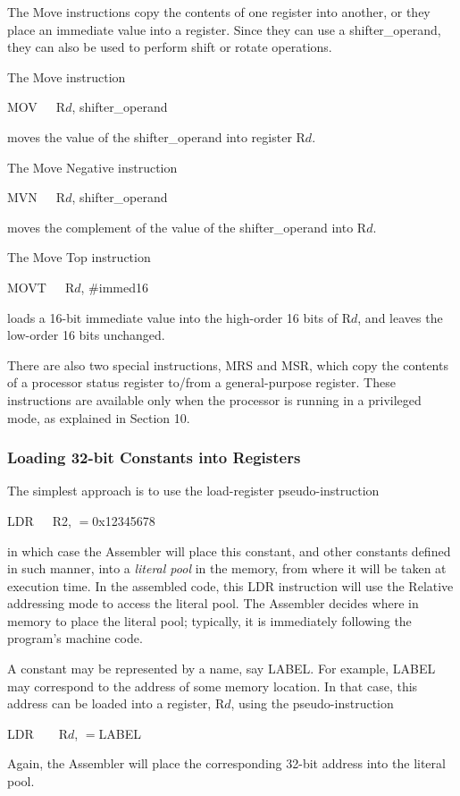 \documentclass[11pt, twoside, pdftex]{article}
\begin{document}
The Move instructions copy the contents of one register into another, or they place an immediate value into a register. 
Since they can use a shifter\_operand, they can also be used
to perform shift or rotate operations.

The Move instruction
\begin{center}
MOV~~~R$d$, shifter\_operand
\end{center}
\noindent 
moves the value of the shifter\_operand into register R$d$. 

The Move Negative instruction
\begin{center}
MVN~~~R$d$, shifter\_operand
\end{center}
\noindent
moves the complement of the value of the shifter\_operand
into R$d$.

The Move Top instruction
\begin{center}
MOVT~~~R$d$, \#immed16
\end{center}
\noindent
loads a 16-bit immediate value into the high-order 16 bits of
R$d$, and leaves the low-order 16 bits unchanged.

There are also two special instructions, MRS and MSR, which copy
the contents of a processor status register to/from a
general-purpose register. These instructions are available only
when the processor is running in a privileged mode, as explained
in Section 10.

\subsubsection{Loading 32-bit Constants into Registers}

The simplest approach is to use the load-register
pseudo-instruction
\begin{center}
LDR~~~R2, $=$0x12345678
\end{center}
\noindent
in which case the Assembler will place this constant, and other
constants defined in such manner, into a {\it literal pool} in the memory, from where it will be taken at execution time.
In the assembled code, this LDR instruction will use the Relative
addressing mode to access the literal pool. The Assembler decides
where in memory to place the literal pool; typically, it is
immediately following the program's machine code.

A constant may be represented by a name, say LABEL. For example,
LABEL may correspond to the address of some memory location. In 
that case, this address can be loaded into a register, R$d$,
using the pseudo-instruction
\begin{center}
LDR~~~~R$d$, $=$LABEL
\end{center}
\noindent
Again, the Assembler will place the corresponding 32-bit address
into the literal pool.
\end{document}
